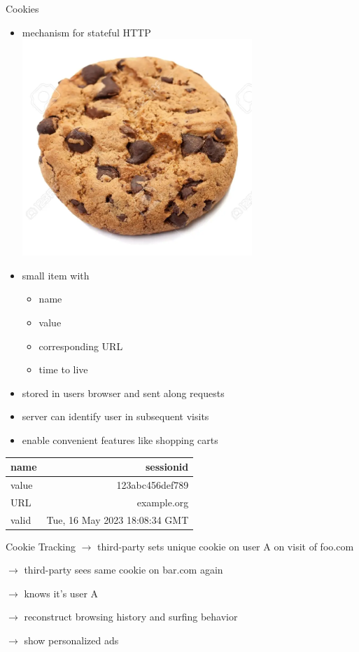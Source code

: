 \documentclass[xcolor={dvipsnames}]{beamer}
\begin{document}
\begin{frame}{Cookies}
    \begin{itemize}
        \item mechanism for stateful HTTP
        \hspace{5em}
        \includegraphics[scale=0.1]{cookie_trans.png}
        \item small item with
            \begin{itemize}
                \item name
                \item value
                \item corresponding URL
                \item time to live
            \end{itemize}
        \item stored in users browser and sent along requests
        \item server can identify user in subsequent visits
        \item enable convenient features like shopping carts
    \end{itemize}
    \footnotesize
    \centering
    \begin{tabular}{ l r }
        name & sessionid \\\hline
        value & 123abc456def789 \\\hline
        URL & example.org \\\hline
        valid & Tue, 16 May 2023 18:08:34 GMT
    \end{tabular}
\end{frame}

\begin{frame}{Cookie Tracking}
    $\rightarrow$ third-party sets unique cookie on user A on visit of foo.com

    $\rightarrow$ third-party sees same cookie on bar.com again

    $\rightarrow$ knows it's user A

    $\rightarrow$ reconstruct browsing history and surfing behavior

    $\rightarrow$ show personalized ads
\end{frame}
\end{document}
